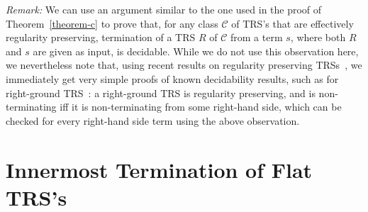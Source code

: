 \documentclass{LMCS}
\theoremstyle{plain}
\newcommand\ignore[1]{}
\begin{document}
\noindent
{\em Remark:}
We can use an argument similar to the one used in the proof of 
Theorem~\ref{theorem-c} to prove that,
for any class ${\mathcal C}$ of TRS's that are effectively
regularity preserving,
termination of a TRS $R$ of ${\mathcal C}$
from a term $s$, where both $R$ and $s$ are given as input, 
is decidable.
While we do not use this observation here,
we nevertheless note that, using recent results on
regularity preserving TRSs~\cite{TakaiKajiSeki00:RTA},  
we immediately get very simple proofs of known decidability results, such as for
right-ground TRS~\cite{Dershowitz81:ICALP}: a right-ground
TRS is regularity preserving, and is non-terminating iff it is 
non-terminating from some right-hand side, which can
be checked for every right-hand side term using the above
observation.

\ignore{
We state below a related new (up to our knowledge) theorem that
uses a similar argument as the proof
of Theorem~\ref{theorem-c}.
\begin{thm}\label{theorem-unused}
Let ${\mathcal C}$ be a class of TRS's that are effectively
regularity preserving.
Termination of a TRS $R$ of ${\mathcal C}$
from a term $s$, where both $R$ and $s$ are given as input, is decidable.
\end{thm}
\proof
Note that $\{s\}$ is a regular tree language.
Since $R$ is effectively regularity preserving,
we can compute a tree automaton $A$ recognizing the
set of terms reachable from $\{s\}$.
The size of the language recognized by $A$ can be
checked to be infinite, in which case we know that there exists
a derivation starting from $s$ with infinitely many
rewrite steps. Otherwise, we have a finite
number of terms reachable from $s$. By producing all possible
derivations starting from $s$ we will either detect a cycle,
thus concluding non-termination, or will halt, thus concluding
termination.\qed



We shall not use Theorem~\ref{theorem-unused} in this paper.
However, we note here that, using recent results on
regularity preserving TRS~\cite{TakaiKajiSeki00:RTA},  
we immediately get very simple
proofs of known decidability results, such as for
right-ground TRS~\cite{Dershowitz81:ICALP}: a right-ground
TRS is regularity preserving, and is non-terminating iff it is 
non-terminating from some right-hand side, which can
be checked for every one using Theorem~\ref{theorem-unused}.
\endignore}

\section{Innermost Termination of Flat TRS's}\label{sec-innermost}
\end{document}
